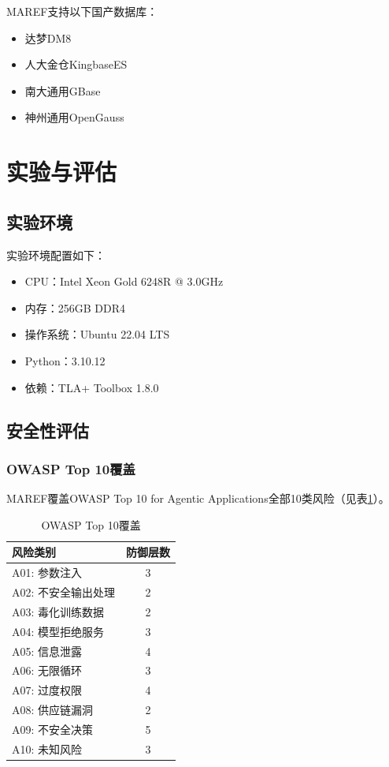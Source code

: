 MAREF支持以下国产数据库：

\begin{itemize}
    \item 达梦DM8
    \item 人大金仓KingbaseES
    \item 南大通用GBase
    \item 神州通用OpenGauss
\end{itemize}

\section{实验与评估}

\subsection{实验环境}

实验环境配置如下：

\begin{itemize}
    \item CPU：Intel Xeon Gold 6248R @ 3.0GHz
    \item 内存：256GB DDR4
    \item 操作系统：Ubuntu 22.04 LTS
    \item Python：3.10.12
    \item 依赖：TLA+ Toolbox 1.8.0
\end{itemize}

\subsection{安全性评估}

\subsubsection{OWASP Top 10覆盖}

MAREF覆盖OWASP Top 10 for Agentic Applications全部10类风险（见表\ref{tab:owasp}）。

\begin{table}[htbp]
\caption{OWASP Top 10覆盖}
\label{tab:owasp}
\begin{tabular}{lc}
\toprule
\textbf{风险类别} & \textbf{防御层数} \\
\midrule
A01: 参数注入 & 3 \\
A02: 不安全输出处理 & 2 \\
A03: 毒化训练数据 & 2 \\
A04: 模型拒绝服务 & 3 \\
A05: 信息泄露 & 4 \\
A06: 无限循环 & 3 \\
A07: 过度权限 & 4 \\
A08: 供应链漏洞 & 2 \\
A09: 不安全决策 & 5 \\
A10: 未知风险 & 3 \\
\bottomrule
\end{tabular}
\end{table}

